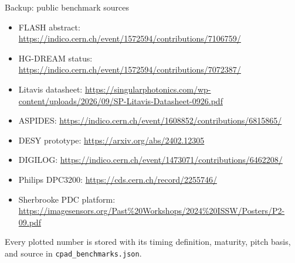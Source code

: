 \documentclass[10pt,aspectratio=169,t]{beamer}
\newcommand{\tightitem}{\setlength\itemsep{0.30em}\setlength\parskip{0pt}}
\begin{document}
\begin{frame}{Backup: public benchmark sources}
  \fontsize{8.5}{10}\selectfont
  \begin{itemize}\tightitem
    \item FLASH abstract: \url{https://indico.cern.ch/event/1572594/contributions/7106759/}
    \item HG-DREAM status: \url{https://indico.cern.ch/event/1572594/contributions/7072387/}
    \item Litavis datasheet: \url{https://singularphotonics.com/wp-content/uploads/2026/09/SP-Litavis-Datasheet-0926.pdf}
    \item ASPIDES: \url{https://indico.cern.ch/event/1608852/contributions/6815865/}
    \item DESY prototype: \url{https://arxiv.org/abs/2402.12305}
    \item DIGILOG: \url{https://indico.cern.ch/event/1473071/contributions/6462208/}
    \item Philips DPC3200: \url{https://cds.cern.ch/record/2255746/}
    \item Sherbrooke PDC platform: \url{https://imagesensors.org/Past\%20Workshops/2024\%20ISSW/Posters/P2-09.pdf}
  \end{itemize}
  \vspace{0.25cm}
  \small Every plotted number is stored with its timing definition, maturity, pitch basis, and source in \texttt{cpad\_benchmarks.json}.
\end{frame}
\end{document}
